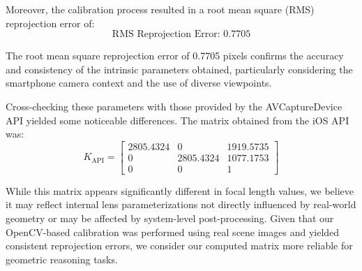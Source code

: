 Moreover, the calibration process resulted in a root mean square (RMS) reprojection error of:
\begin{equation*}
    \text{RMS Reprojection Error: } 0.7705
\end{equation*}

The root mean square reprojection error of 0.7705 pixels confirms the accuracy and consistency of the intrinsic parameters obtained, particularly considering the smartphone camera context and the use of diverse viewpoints.

Cross-checking these parameters with those provided by the AVCaptureDevice API yielded some noticeable differences. The matrix obtained from the iOS API was:
\begin{equation}
    K_{\text{API}} =
    \begin{bmatrix}
    2805.4324 & 0 & 1919.5735 \\
    0 & 2805.4324 & 1077.1753 \\
    0 & 0 & 1
    \end{bmatrix}
\end{equation}

While this matrix appears significantly different in focal length values, we believe it may reflect internal lens parameterizations not directly influenced by real-world geometry or may be affected by system-level post-processing. Given that our OpenCV-based calibration was performed using real scene images and yielded consistent reprojection errors, we consider our computed matrix more reliable for geometric reasoning tasks.

